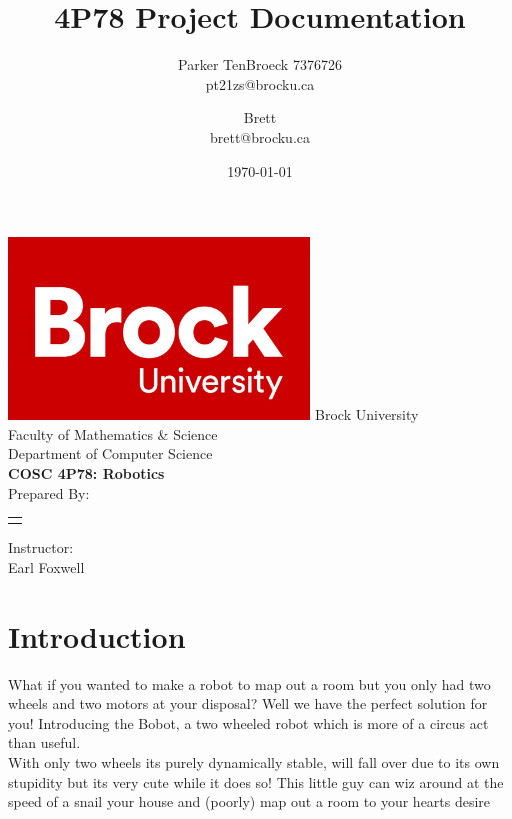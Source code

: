 \documentclass[12pt]{article}
\begin{document}
\title{4P78 Project Documentation}
\author{
    Parker TenBroeck 7376726\\
    pt21zs@brocku.ca
    \and
    Brett \\
    brett@brocku.ca
}
\date{\today}

\makeatletter
\begin{titlepage}
	\def \LOGOPATH {brock.jpg} %
	\def \UNIVERSITY {Brock University}
	\def \FACULTY {Faculty of Mathematics \& Science}
	\def \DEPARTMENT {Department of Computer Science}
	\def \COURSETITLE {COSC 4P78: Robotics}
	\def \SUPERVISOR {Earl Foxwell}
	
	
	\vfill
	\begin{center}
		\includegraphics[width=0.6\textwidth]{brock.jpg}
		\fontsize{14pt}{14pt}\selectfont
		\vfill
		\UNIVERSITY \\
		\FACULTY \\
		\DEPARTMENT \\
		\vfill
		\fontsize{18pt}{18pt}\selectfont
		\textbf{\COURSETITLE} \\[0.5cm]
		\textbf{\@title}
		\vfill
		\fontsize{14pt}{14pt}\selectfont
		Prepared By: \\[0.5cm]
		
		\begin{tabular}[t]{c}
			\@author
		\end{tabular}\par
	
	    \vfill
		Instructor: \\
		\SUPERVISOR
		\vfill
		\@date
	\end{center}
\end{titlepage}
\makeatother

\tableofcontents
\newpage

\section{Introduction}
What if you wanted to make a robot to map out a room but you only had two wheels and two motors at your disposal? Well we have the perfect solution for you! Introducing the Bobot, a two wheeled robot which is more of a circus act than useful. \\
With only two wheels its purely dynamically stable, will fall over due to its own stupidity but its very cute while it does so! This little guy can wiz around at the speed of a snail your house and (poorly) map out a room to your hearts desire
\end{document}
